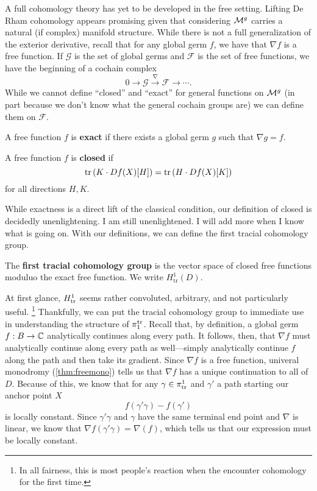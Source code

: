 A full cohomology theory has yet to be developed in the free setting. Lifting
De Rham cohomology appears promising given that considering \(\mathcal{M}^{g} \) carries
a natural (if complex) manifold structure. While there is not a full
generalization of the exterior derivative, recall that for any global germ \(f\),
we have that \(\nabla f\) is a free function. If \(\mathcal{G}\) is the set of
global germs and \(\mathcal{F}\) is the set of free functions, we have the
beginning of a cochain complex
\[
  0 \rightarrow \mathcal{G} \xrightarrow{\nabla} \mathcal{F} \rightarrow \cdots.
\]
While we cannot define ``closed'' and ``exact'' for general functions on
\(\mathcal{M}^{g} \) (in part because we don't know what the general cochain groups are)
we can define them on \(\mathcal{F}\).
\begin{definition}[Exact]%
\label{def:exact}
  A free function \(f\) is \textbf{exact} if there exists a global germ \(g\)
  such that \(\nabla g = f\).
\end{definition}
\begin{definition}[Closed]%
\label{def:closed}
  A free function \(f\) is \textbf{closed} if
  \[
    \operatorname{tr} \left( K \cdot Df(X)[H] \right) = \operatorname{tr} \left( H \cdot Df(X)[K] \right)
  \]
  for all directions \(H,K\).
\end{definition}

While exactness is a direct lift of the classical condition, our definition of
closed is decidedly unenlightening. {\color{red} I am still unenlightened. I
  will add more when I know what is going on.} With our definitions, we can
define the first tracial cohomology group.

\begin{definition}%
\label{def:firsttrcohomo}
  The \textbf{first tracial cohomology group} is the vector space of closed free
  functions moduluo the exact free function. We write \(H^1_{\textrm{tr}}(D) \).
\end{definition}

At first glance, \(H^1_{\operatorname{tr}}\) seems rather convoluted, arbitrary, and not
particularly useful.
\footnote{In all fairness, this is most people's reaction when the encounter
  cohomology for the first time.}
Thankfully, we can put the tracial cohomology group to immediate use in
understanding the structure of \(\pi_1^{\operatorname{tr}}\). Recall that, by definition, a
global germ \(f:B\to \mathbb{C} \) analytically continues along every path. It follows,
then, that \(\nabla f\) must analytically continue along every path as
well---simply analytically continue \(f\) along the path and then take its
gradient. Since \(\nabla f \) is a free function, univeral monodromy
(\cref{thm:freemono}) tells us that \(\nabla f\) has a unique continuation to
all of \(D\). Because of this, we know that for any \(\gamma \in \pi_{\operatorname{tr}}^1\)
and \(\gamma'\) a path starting our anchor point \(X\)
\[
  f(\gamma'\gamma)-f(\gamma')
\]
is locally constant. Since \(\gamma'\gamma\) and \(\gamma\) have the same
terminal end point and \(\nabla\) is linear, we know that
\(\nabla f(\gamma'\gamma)=\nabla(f)\), which tells us that our expression must
be locally constant.

